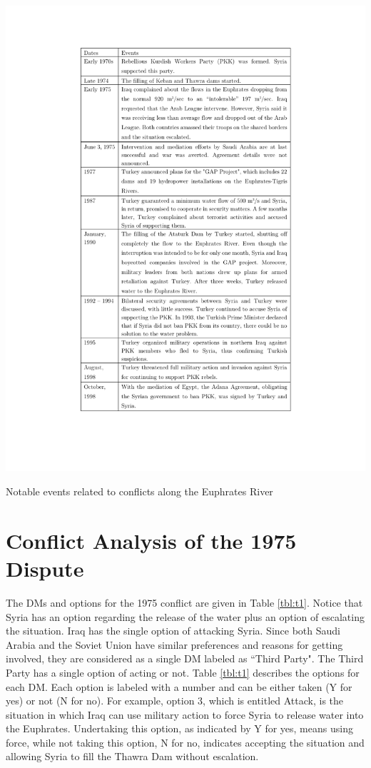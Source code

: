 \documentclass[letterpaper,12pt,titlepage,oneside,final]{book}
\begin{document}
\begin{table}[H]
\centering
\includegraphics[scale=.88]{PDF-IMG/Euphrates_history.pdf}

\caption{Notable events related to conflicts along the Euphrates River}

\label{tbl:historyEuphrates}
\end{table}


\section{Conflict Analysis of the 1975 Dispute}
The DMs and options for the 1975 conflict are given in Table \ref{tbl:t1}. Notice that Syria has an option regarding the release of the water plus an option of escalating the situation. Iraq has the single option of attacking Syria. Since both Saudi Arabia and the Soviet Union have similar preferences and reasons for getting involved, they are considered as a single DM labeled as ``Third Party". The Third Party has a single option of acting or not. Table \ref{tbl:t1} describes the options for each DM. Each option is labeled with a number and can be either taken (Y for yes) or not (N for no). For example, option 3, which is entitled Attack, is the situation in which Iraq can use military action to force Syria to release water into the Euphrates. Undertaking this option, as indicated by Y for yes, means using force, while not taking this option, N for no, indicates accepting the situation and allowing Syria to fill the Thawra Dam without escalation.
\end{document}
